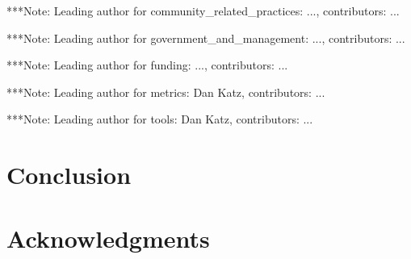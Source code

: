 \documentclass[11pt, oneside]{amsart}
\newcommand{\note}[1]{ {\textcolor{blueish}    { ***Note:      #1 }}}
\begin{document}
\note{Leading author for community_related_practices: ..., contributors: ...}


\note{Leading author for government_and_management: ..., contributors: ...}


\note{Leading author for funding: ..., contributors: ...}


\note{Leading author for metrics: Dan Katz, contributors: ...}
 

\note{Leading author for tools: Dan Katz, contributors: ...}


\section{Conclusion} \label{sec:conclusion}

\section*{Acknowledgments} \label{sec:acks}






\end{document}
